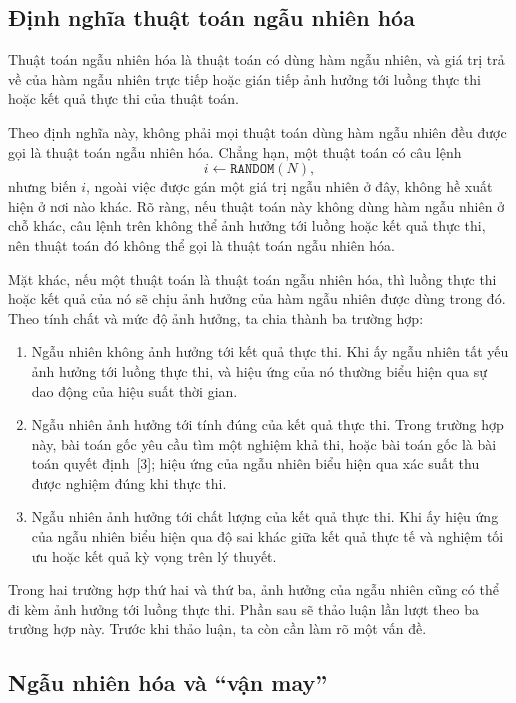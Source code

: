 \documentclass[11pt]{article}
\begin{document}
\subsection{Định nghĩa thuật toán ngẫu nhiên hóa}

Thuật toán ngẫu nhiên hóa là thuật toán có dùng hàm ngẫu nhiên, và giá trị trả
về của hàm ngẫu nhiên trực tiếp hoặc gián tiếp ảnh hưởng tới luồng thực thi
hoặc kết quả thực thi của thuật toán.

Theo định nghĩa này, không phải mọi thuật toán dùng hàm ngẫu nhiên đều được
gọi là thuật toán ngẫu nhiên hóa. Chẳng hạn, một thuật toán có câu lệnh
\[
  i \leftarrow \texttt{RANDOM}(N),
\]
nhưng biến \(i\), ngoài việc được gán một giá trị ngẫu nhiên ở đây, không hề
xuất hiện ở nơi nào khác. Rõ ràng, nếu thuật toán này không dùng hàm ngẫu
nhiên ở chỗ khác, câu lệnh trên không thể ảnh hưởng tới luồng hoặc kết quả
thực thi, nên thuật toán đó không thể gọi là thuật toán ngẫu nhiên hóa.

Mặt khác, nếu một thuật toán là thuật toán ngẫu nhiên hóa, thì luồng thực thi
hoặc kết quả của nó sẽ chịu ảnh hưởng của hàm ngẫu nhiên được dùng trong đó.
Theo tính chất và mức độ ảnh hưởng, ta chia thành ba trường hợp:
\begin{enumerate}
  \item Ngẫu nhiên không ảnh hưởng tới kết quả thực thi. Khi ấy ngẫu nhiên tất
  yếu ảnh hưởng tới luồng thực thi, và hiệu ứng của nó thường biểu hiện qua sự
  dao động của hiệu suất thời gian.

  \item Ngẫu nhiên ảnh hưởng tới tính đúng của kết quả thực thi. Trong trường
  hợp này, bài toán gốc yêu cầu tìm một nghiệm khả thi, hoặc bài toán gốc là
  bài toán quyết định~[3]; hiệu ứng của ngẫu nhiên biểu hiện qua xác suất thu
  được nghiệm đúng khi thực thi.

  \item Ngẫu nhiên ảnh hưởng tới chất lượng của kết quả thực thi. Khi ấy hiệu
  ứng của ngẫu nhiên biểu hiện qua độ sai khác giữa kết quả thực tế và nghiệm
  tối ưu hoặc kết quả kỳ vọng trên lý thuyết.
\end{enumerate}

Trong hai trường hợp thứ hai và thứ ba, ảnh hưởng của ngẫu nhiên cũng có thể
đi kèm ảnh hưởng tới luồng thực thi. Phần sau sẽ thảo luận lần lượt theo ba
trường hợp này. Trước khi thảo luận, ta còn cần làm rõ một vấn đề.

\subsection{Ngẫu nhiên hóa và ``vận may''}
\end{document}
